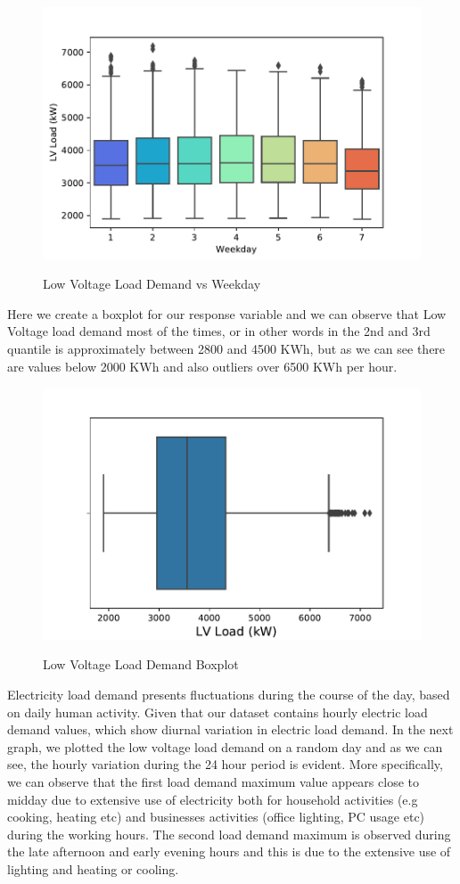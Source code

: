 \begin{figure}[h!]
\centering
\includegraphics[width=0.75\linewidth]{project/eda2.pdf}
\label{fig:felix}
\caption{Low Voltage Load Demand vs Weekday}
\end{figure}
Here we create a boxplot for our response variable and we can observe that Low Voltage load demand most of the times, or in other words in the 2nd and 3rd quantile is approximately between 2800 and 4500 KWh, but as we can see there are values below 2000 KWh and also outliers over 6500 KWh per hour.
\begin{figure}[h!]
\centering
\includegraphics[width=0.7\linewidth]{project/eda3.pdf}
\label{fig:felix}
\caption{Low Voltage Load Demand Boxplot}
\end{figure}
Electricity load demand presents fluctuations during the course of the day, based on daily human activity. Given that our dataset contains hourly electric load demand values, which show diurnal variation in electric load demand. In the next graph, we plotted the low voltage load demand on a random day and as we can see, the hourly variation during the 24 hour period is evident. More specifically, we can observe that the first load demand maximum value appears close to midday due to extensive use of electricity both for household activities (e.g cooking, heating etc) and businesses activities (office lighting, PC usage etc) during the working hours. The second load demand maximum is observed during the late afternoon and early evening hours and this is due to the extensive use of lighting and heating or cooling.
